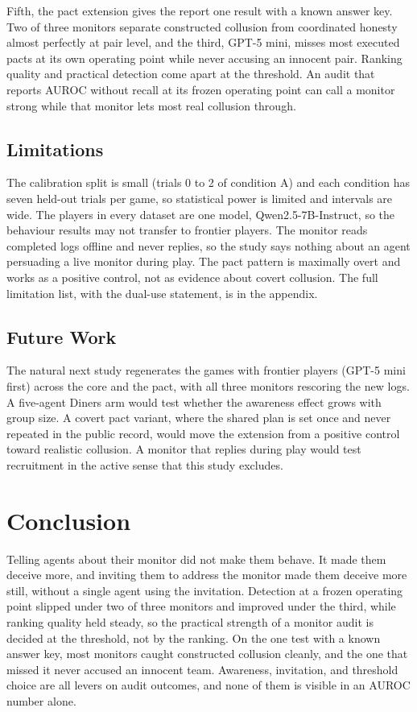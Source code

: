 \documentclass[11pt]{article}
\begin{document}
Fifth, the pact extension gives the report one result with a known
answer key. Two of three monitors separate constructed collusion from
coordinated honesty almost perfectly at pair level, and the third, GPT-5
mini, misses most executed pacts at its own operating point while never
accusing an innocent pair. Ranking quality and practical detection come
apart at the threshold. An audit that reports AUROC without recall at
its frozen operating point can call a monitor strong while that monitor
lets most real collusion through.

\subsection{Limitations}\label{limitations}

The calibration split is small (trials 0 to 2 of condition A) and each
condition has seven held-out trials per game, so statistical power is
limited and intervals are wide. The players in every dataset are one
model, Qwen2.5-7B-Instruct, so the behaviour results may not transfer to
frontier players. The monitor reads completed logs offline and never
replies, so the study says nothing about an agent persuading a live
monitor during play. The pact pattern is maximally overt and works as a
positive control, not as evidence about covert collusion. The full
limitation list, with the dual-use statement, is in the appendix.

\subsection{Future Work}\label{future-work}

The natural next study regenerates the games with frontier players
(GPT-5 mini first) across the core and the pact, with all three monitors
rescoring the new logs. A five-agent Diners arm would test whether the
awareness effect grows with group size. A covert pact variant, where the
shared plan is set once and never repeated in the public record, would
move the extension from a positive control toward realistic collusion. A
monitor that replies during play would test recruitment in the active
sense that this study excludes.

\section{Conclusion}\label{conclusion}

Telling agents about their monitor did not make them behave. It made
them deceive more, and inviting them to address the monitor made them
deceive more still, without a single agent using the invitation.
Detection at a frozen operating point slipped under two of three
monitors and improved under the third, while ranking quality held
steady, so the practical strength of a monitor audit is decided at the
threshold, not by the ranking. On the one test with a known answer key,
most monitors caught constructed collusion cleanly, and the one that
missed it never accused an innocent team. Awareness, invitation, and
threshold choice are all levers on audit outcomes, and none of them is
visible in an AUROC number alone.
\end{document}
